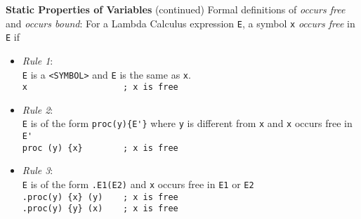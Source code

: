 \begin{minipage}[t]{\sw}
\slidenumber
\LARGE
{\bf Static Properties of Variables} (continued)\exx
\Large
\emm\LightBox{\MYlambda}\exx
Formal definitions of {\em occurs free} and {\em occurs bound}:\exx
For a Lambda Calculus expression \verb'E', a symbol \verb'x'
{\em occurs free} in \verb'E' if
\begin{itemize}
\item   {\em Rule 1}:\\
	\verb'E' is a \verb'<SYMBOL>' and \verb'E' is the same as \verb'x'.\\
	\emm\verb'x                   ; x is free'
\item   {\em Rule 2}:\\
	\verb'E' is of the form \verb:proc(y){E'}:
	where \verb'y' is different from \verb'x'
	and \verb'x' occurs free in \verb:E':\\
	\emm\verb'proc (y) {x}        ; x is free'
\item   {\em Rule 3}:\\
	\verb'E' is of the form \verb'.E1(E2)'
	and \verb'x' occurs free in \verb'E1' or \verb'E2'\\
	\emm\verb'.proc(y) {x} (y)    ; x is free'\\
	\emm\verb'.proc(y) {y} (x)    ; x is free'\\
\end{itemize}
\end{minipage}
\clearpage
